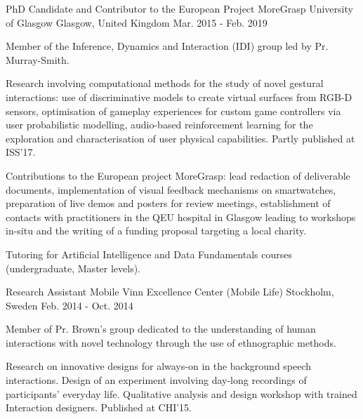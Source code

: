 \begin{cventries}
  \cventry
    {PhD Candidate and Contributor to the European Project MoreGrasp} %
    {University of Glasgow} %
    {Glasgow, United Kingdom} %
    {Mar. 2015 - Feb. 2019} %
    {
      \begin{cvitems} %
        \item {Member of the Inference, Dynamics and Interaction (IDI) group led by Pr. Murray-Smith.}
        \item {Research involving computational methods for the study of novel gestural interactions: use of discriminative models to create virtual surfaces from RGB-D sensors, optimisation of gameplay experiences for custom game controllers via user probabilistic modelling, audio-based reinforcement learning for the exploration and characterisation of user physical capabilities. Partly published at ISS’17.}
        \item {Contributions to the European project MoreGrasp: lead redaction of deliverable documents, implementation of visual feedback mechanisms on smartwatches, preparation of live demos and posters for review meetings, establishment of contacts with practitioners in the QEU hospital in Glasgow leading to workshops in-situ and the writing of a funding proposal targeting a local charity.}
        \item {Tutoring for Artificial Intelligence and Data Fundamentals courses (undergraduate, Master levels).}
      \end{cvitems}
    }

  \cventry
    {Research Assistant} %
    {Mobile Vinn Excellence Center (Mobile Life)} %
    {Stockholm, Sweden} %
    {Feb. 2014 - Oct. 2014} %
    {
      \begin{cvitems} %
        \item {Member of Pr. Brown’s group dedicated to the understanding of human interactions with novel technology through the use of ethnographic methods.}
        \item {Research on innovative designs for always-on in the background speech interactions. Design of an experiment involving day-long recordings of participants’ everyday life. Qualitative analysis and design workshop with trained Interaction designers. Published at CHI’15.}
      \end{cvitems}
    }
\end{cventries}
